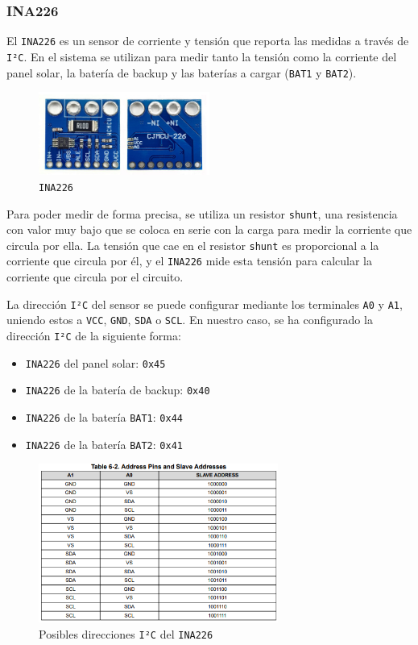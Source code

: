 \subsubsection{INA226}

El \texttt{INA226} es un sensor de corriente y tensión que reporta las medidas a través de \texttt{I²C}. En el sistema se utilizan para medir tanto la tensión como la corriente del panel solar, la batería de backup y las baterías a cargar (\texttt{BAT1} y \texttt{BAT2}).\cite{texasinstrumentsINA22636V16Bit}

\begin{figure}[h]
    \centering
    \includegraphics[width=0.5\textwidth]{images/2-hardware/componentes/INA226.jpg}
    \caption{\texttt{INA226}}
    \label{fig:hardware/modulos/ina226}
\end{figure}

Para poder medir de forma precisa, se utiliza un resistor \texttt{shunt}, una resistencia con valor muy bajo que se coloca en serie con la carga para medir la corriente que circula por ella. La tensión que cae en el resistor \texttt{shunt} es proporcional a la corriente que circula por él, y el \texttt{INA226} mide esta tensión para calcular la corriente que circula por el circuito.

La dirección \texttt{I²C} del sensor se puede configurar mediante los terminales \texttt{A0} y \texttt{A1}, uniendo estos a \texttt{VCC}, \texttt{GND}, \texttt{SDA} o \texttt{SCL}. En nuestro caso, se ha configurado la dirección \texttt{I²C} de la siguiente forma:

\begin{itemize}
    \item \texttt{INA226} del panel solar: \texttt{0x45}
    \item \texttt{INA226} de la batería de backup: \texttt{0x40}
    \item \texttt{INA226} de la batería \texttt{BAT1}: \texttt{0x44}
    \item \texttt{INA226} de la batería \texttt{BAT2}: \texttt{0x41}
\end{itemize}

\begin{figure}[h]
    \centering
    \includegraphics[width=0.7\textwidth]{images/2-hardware/componentes/direcciones_ina.png}
    \caption{Posibles direcciones \texttt{I²C} del \texttt{INA226}}
    \label{fig:hardware/modulos/direcciones_ina}
\end{figure}